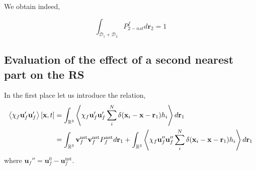 We obtain indeed, 

\begin{equation}
    \int_{
        \mathcal{D}_1 + \mathcal{D}_2
    }
    P_{2-nst}^f
    d\textbf{r}_2 
    = 
    1
\end{equation}


\subsection{Evaluation of the effect of a second nearest part on the RS}

In the first place let us introduce the relation, 
\begin{align*}
    \left<\chi_f \textbf{u}_f'\textbf{u}_f'\right>[\textbf{x},t]
    &= 
    \int_{\mathbb{R}^3}
    \left<\chi_f \textbf{u}_f'\textbf{u}_f' 
    \sum_i^N \delta(\textbf{x}_i - \textbf{x}- \textbf{r}_1)
    h_i
    \right>
    d\textbf{r}_1\\
    &= 
    \int_{\mathbb{R}^3}
    \textbf{v}_f^\text{nst}
    \textbf{v}_f^\text{nst}
    P_f^\text{nst}
    d\textbf{r}_1
    + 
    \int_{\mathbb{R}^3}
    \left<\chi_f \textbf{u}_f''\textbf{u}_f'' 
    \sum_i^N \delta(\textbf{x}_i - \textbf{x}- \textbf{r}_1)
    h_i
    \right>
    d\textbf{r}_1
\end{align*}
where $\textbf{u}_f'' = \textbf{u}_f^0 - \textbf{u}_f^\text{nst}$. 


